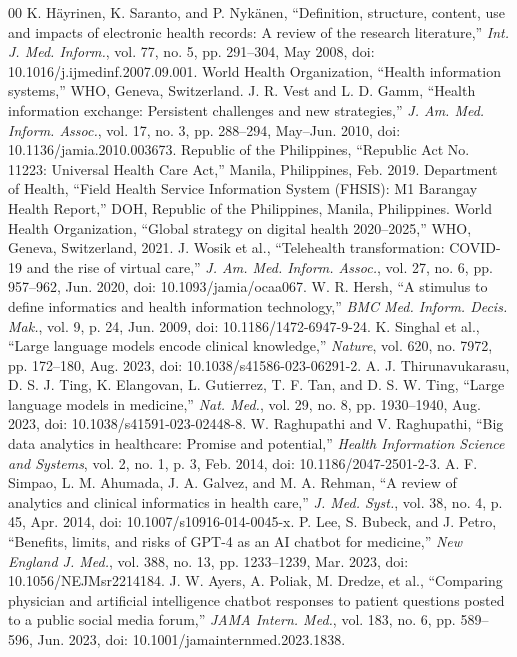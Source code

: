 \documentclass[conference]{IEEEtran}
\begin{document}
\begin{thebibliography}{00}
 K. H\"ayrinen, K. Saranto, and P. Nyk\"anen, ``Definition, structure, content, use and impacts of electronic health records: A review of the research literature,'' \textit{Int. J. Med. Inform.}, vol. 77, no. 5, pp. 291--304, May 2008, doi: 10.1016/j.ijmedinf.2007.09.001.
 World Health Organization, ``Health information systems,'' WHO, Geneva, Switzerland.
 J. R. Vest and L. D. Gamm, ``Health information exchange: Persistent challenges and new strategies,'' \textit{J. Am. Med. Inform. Assoc.}, vol. 17, no. 3, pp. 288--294, May--Jun. 2010, doi: 10.1136/jamia.2010.003673.
 Republic of the Philippines, ``Republic Act No. 11223: Universal Health Care Act,'' Manila, Philippines, Feb. 2019.
 Department of Health, ``Field Health Service Information System (FHSIS): M1 Barangay Health Report,'' DOH, Republic of the Philippines, Manila, Philippines.
 World Health Organization, ``Global strategy on digital health 2020--2025,'' WHO, Geneva, Switzerland, 2021.
 J. Wosik et al., ``Telehealth transformation: COVID-19 and the rise of virtual care,'' \textit{J. Am. Med. Inform. Assoc.}, vol. 27, no. 6, pp. 957--962, Jun. 2020, doi: 10.1093/jamia/ocaa067.
 W. R. Hersh, ``A stimulus to define informatics and health information technology,'' \textit{BMC Med. Inform. Decis. Mak.}, vol. 9, p. 24, Jun. 2009, doi: 10.1186/1472-6947-9-24.
 K. Singhal et al., ``Large language models encode clinical knowledge,'' \textit{Nature}, vol. 620, no. 7972, pp. 172--180, Aug. 2023, doi: 10.1038/s41586-023-06291-2.
 A. J. Thirunavukarasu, D. S. J. Ting, K. Elangovan, L. Gutierrez, T. F. Tan, and D. S. W. Ting, ``Large language models in medicine,'' \textit{Nat. Med.}, vol. 29, no. 8, pp. 1930--1940, Aug. 2023, doi: 10.1038/s41591-023-02448-8.
 W. Raghupathi and V. Raghupathi, ``Big data analytics in healthcare: Promise and potential,'' \textit{Health Information Science and Systems}, vol. 2, no. 1, p. 3, Feb. 2014, doi: 10.1186/2047-2501-2-3.
 A. F. Simpao, L. M. Ahumada, J. A. Galvez, and M. A. Rehman, ``A review of analytics and clinical informatics in health care,'' \textit{J. Med. Syst.}, vol. 38, no. 4, p. 45, Apr. 2014, doi: 10.1007/s10916-014-0045-x.
 P. Lee, S. Bubeck, and J. Petro, ``Benefits, limits, and risks of GPT-4 as an AI chatbot for medicine,'' \textit{New England J. Med.}, vol. 388, no. 13, pp. 1233--1239, Mar. 2023, doi: 10.1056/NEJMsr2214184.
 J. W. Ayers, A. Poliak, M. Dredze, et al., ``Comparing physician and artificial intelligence chatbot responses to patient questions posted to a public social media forum,'' \textit{JAMA Intern. Med.}, vol. 183, no. 6, pp. 589--596, Jun. 2023, doi: 10.1001/jamainternmed.2023.1838.

\end{thebibliography}
\end{document}
